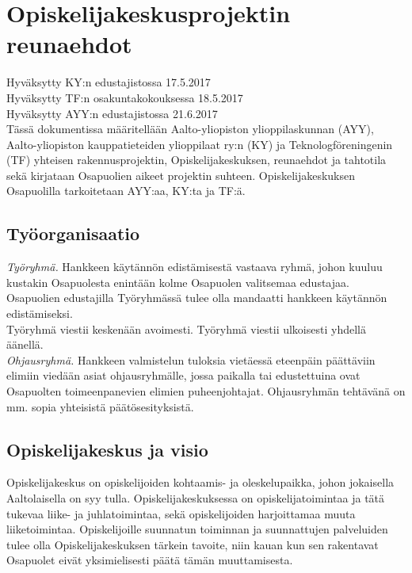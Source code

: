 \documentclass[a4paper, 12pt, finnish]{report}
\begin{document}
\chapter{Opiskelijakeskusprojektin\\reunaehdot}
Hyväksytty KY:n edustajistossa 17.5.2017\\
Hyväksytty TF:n osakuntakokouksessa 18.5.2017\\
Hyväksytty AYY:n edustajistossa 21.6.2017\\

Tässä dokumentissa määritellään Aalto-yliopiston ylioppilaskunnan (AYY), Aalto-yliopiston kauppatieteiden ylioppilaat ry:n (KY) ja Teknologföreningenin (TF) yhteisen rakennusprojektin, Opiskelijakeskuksen, reunaehdot ja tahtotila sekä kirjataan Osapuolien aikeet projektin suhteen.
Opiskelijakeskuksen Osapuolilla tarkoitetaan AYY:aa, KY:ta ja TF:ä.


\section*{Työorganisaatio}
\textit{Työryhmä.} Hankkeen käytännön edistämisestä vastaava ryhmä, johon kuuluu kustakin Osapuolesta enintään kolme Osapuolen valitsemaa edustajaa.
Osapuolien edustajilla Työryhmässä tulee olla mandaatti hankkeen käytännön edistämiseksi.\\

Työryhmä viestii keskenään avoimesti. Työryhmä viestii ulkoisesti yhdellä äänellä.\\

\textit{Ohjausryhmä.} Hankkeen valmistelun tuloksia vietäessä eteenpäin päättäviin elimiin viedään asiat ohjausryhmälle, jossa paikalla tai edustettuina ovat Osapuolten toimeenpanevien elimien puheenjohtajat.
Ohjausryhmän tehtävänä on mm. sopia yhteisistä päätösesityksistä.

\section*{Opiskelijakeskus ja visio}
Opiskelijakeskus on opiskelijoiden kohtaamis- ja oleskelupaikka, johon jokaisella Aaltolaisella on syy tulla.
Opiskelijakeskuksessa on opiskelijatoimintaa ja tätä tukevaa liike- ja juhlatoimintaa, sekä opiskelijoiden harjoittamaa muuta liiketoimintaa.
Opiskelijoille suunnatun toiminnan ja suunnattujen palveluiden tulee olla Opiskelijakeskuksen tärkein tavoite, niin kauan kun sen rakentavat Osapuolet eivät yksimielisesti päätä tämän muuttamisesta.\\
\end{document}
